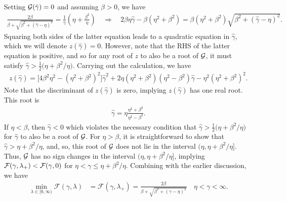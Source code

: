 \documentclass[a4paper,10pt]{article}
\begin{document}
Setting ${\cal G}(\hat{\gamma}) = 0$ and assuming $\beta > 0$, we have
\begin{align*}
\frac{2\beta}{\beta + \sqrt{\beta^2 + (\hat{\gamma}-\eta)^2}} 
=
\frac{1}{\hat{\gamma}} \left(\eta + \frac{\beta^2}{\eta} \right) 
\quad \Longrightarrow \quad
2\beta \eta \hat{\gamma} -\beta(\eta^2 + \beta^2) 
= 
\beta(\eta^2 + \beta^2) \sqrt{\beta^2 + (\hat{\gamma}-\eta)^2}. 
\end{align*}
Squaring both sides of the latter equation leads to a quadratic equation in $\hat{\gamma}$, which we will denote $z(\hat{\gamma}) = 0$. However, note that the RHS of the latter equation is positive, and so for any root of $z$ to also be a root of ${\cal G}$, it must satisfy $\hat{\gamma} > \tfrac{1}{2} \big( \eta + \beta^2 / \eta)$. Carrying out the calculation, we have
\begin{align*}
z(\hat{\gamma}) = \big[ 4 \beta^2 \eta^2 - (\eta^2 + \beta^2)^2 \big] \hat{\gamma}^2 + 2 \eta (\eta^2 + \beta^2)(\eta^2 - \beta^2) \hat{\gamma} - \eta^2(\eta^2 + \beta^2)^2.
\end{align*}
%
Note that the discriminant of $z(\hat{\gamma})$ is zero, implying
$z(\hat{\gamma})$ has one real root. This root is
%
\begin{align} \label{eq:gamma_hat}
\hat{\gamma} = \eta \frac{\eta^2 + \beta^2}{\eta^2 - \beta^2}. 
\end{align}
%
If $\eta < \beta$, then $\hat{\gamma} < 0$ which violates the necessary condition that $\hat{\gamma} > \tfrac{1}{2} \big( \eta + \beta^2 / \eta)$ for $\hat{\gamma}$ to also be a root of ${\cal G}$. For $\eta > \beta$, it is straightforward to show that
$\hat{\gamma} > \eta+\beta^2/\eta$, and, so, this root of ${\cal G}$ does not lie in the interval $(\eta,\eta+\beta^2/\eta]$. Thus, ${\cal G}$ has no sign changes
in the interval $(\eta,\eta+\beta^2/\eta]$, implying
${\cal F} (\gamma, \lambda_+) < {\cal F}(\gamma, 0)$ for $\eta < \gamma
\leq \eta + \beta^2/\eta.$ Combining with the earlier discussion, we have
%
\begin{align*}
\min_{\lambda\in[0,\infty)} \mathcal{F}(\gamma,\lambda) &=
	\mathcal{F}(\gamma,\lambda_+) =
\frac{2\beta}{\beta + \sqrt{\beta^2 + (\gamma-\eta)^2}}
	\quad \eta < \gamma < \infty.
\end{align*}
%
\end{document}
